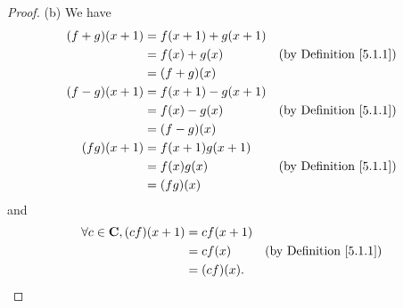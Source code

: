 \begin{proof}{(b)}
    We have
    \begin{align*}
        (f + g)(x + 1) & = f(x + 1) + g(x + 1)                                      \\
                       & = f(x) + g(x)         & \text{(by Definition \ref{5.1.1})} \\
                       & = (f + g)(x)                                               \\
        (f - g)(x + 1) & = f(x + 1) - g(x + 1)                                      \\
                       & = f(x) - g(x)         & \text{(by Definition \ref{5.1.1})} \\
                       & = (f - g)(x)                                               \\
        (f g)(x + 1)   & = f(x + 1) g(x + 1)                                        \\
                       & = f(x) g(x)           & \text{(by Definition \ref{5.1.1})} \\
                       & = (f g)(x)
    \end{align*}
    and
    \begin{align*}
        \forall c \in \mathbf{C}, (c f)(x + 1) & = c f(x + 1)                                      \\
                                       & = c f(x)     & \text{(by Definition \ref{5.1.1})} \\
                                       & = (c f)(x).
    \end{align*}
\end{proof}

